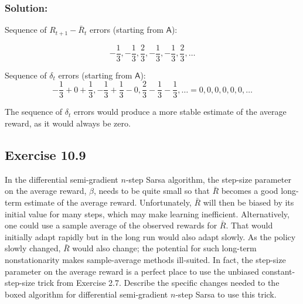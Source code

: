 \subsubsection*{Solution:}

Sequence of $R_{t+1} - \bar{R}_t$ errors (starting from $\mathsf{A}$):

\[
    - \frac{1}{3}, - \frac{1}{3}, \frac{2}{3}, - \frac{1}{3}, - \frac{1}{3}, \frac{2}{3}, \dots
\]

Sequence of $\delta_t$ errors (starting from $\mathsf{A}$):
\[
    - \frac{1}{3} + 0 + \frac{1}{3}, - \frac{1}{3} + \frac{1}{3} - 0, \frac{2}{3} - \frac{1}{3} - \frac{1}{3}, \dots = 0,0,0,0,0,0, \dots
\]

The sequence of $\delta_t$ errors would produce a more stable estimate of the average reward, as it would always be zero.

\subsection*{Exercise 10.9}

In the differential semi-gradient $n$-step Sarsa algorithm, the step-size
parameter on the average reward, $\beta$, needs to be quite small so that $\bar{R}$ becomes a good
long-term estimate of the average reward. Unfortunately, $\bar{R}$ will then be biased by its
initial value for many steps, which may make learning inefficient. Alternatively, one could
use a sample average of the observed rewards for $\bar{R}$. That would initially adapt rapidly
but in the long run would also adapt slowly. As the policy slowly changed, $\bar{R}$ would also
change; the potential for such long-term nonstationarity makes sample-average methods
ill-suited. In fact, the step-size parameter on the average reward is a perfect place to use
the unbiased constant-step-size trick from Exercise 2.7. Describe the specific changes
needed to the boxed algorithm for differential semi-gradient $n$-step Sarsa to use this
trick.

